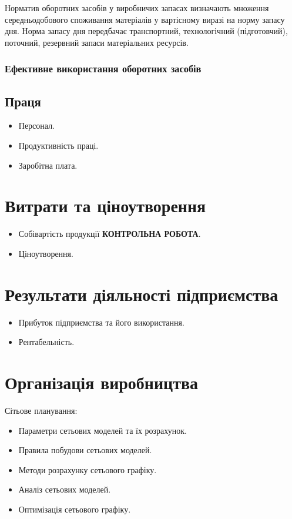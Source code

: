 \documentclass[a4paper,10pt,notitlepage,pdftex,headsepline]{scrartcl}
\begin{document}
      Норматив оборотних засобів у виробничих запасах визначають множення
      середньодобового споживання матеріалів у вартісному виразі на норму
      запасу дня.
      Норма запасу дня передбачає транспортний, технологічний (підготовчий),
      поточний, резервний запаси матеріальних ресурсів.
    \subsubsection{Ефективне використання оборотних засобів}
  \subsection{Праця}
    \begin{itemize}
      \item Персонал.
      \item Продуктивність праці.
      \item Заробітна плата.
    \end{itemize}
\section{Витрати та ціноутворення}
  \begin{itemize}
    \item Собівартість продукції \textbf{КОНТРОЛЬНА РОБОТА}.
    \item Ціноутворення.
  \end{itemize}
\section{Результати діяльності підприємства}
  \begin{itemize}
    \item Прибуток підприємства та його використання.
    \item Рентабельність.
  \end{itemize}
\section{Організація виробництва}
  Сітьове планування:
    \begin{itemize}
      \item Параметри сетьових моделей та їх розрахунок.
      \item Правила побудови сетьових моделей.
      \item Методи розрахунку сетьового графіку.
      \item Аналіз сетьових моделей.
      \item Оптимізація сетьового графіку.
    \end{itemize}
\end{document}
